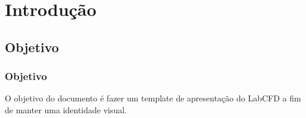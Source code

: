 \section{Introdução}

\subsection{Objetivo}

\begin{frame}
 \frametitle{Objetivo}

 \noindent O objetivo do documento é fazer um template de apresentação do LabCFD a fim de manter uma identidade visual.

\end{frame}







